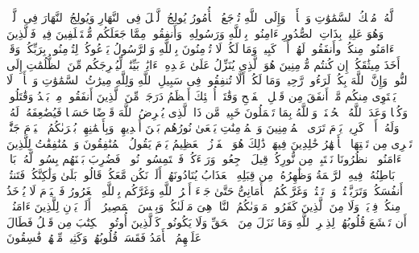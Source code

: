 \stopbuffer%
\startbuffer[\q:57:5]
لَّهُۥ مُلۡكُ ٱلسَّمَٰوَٰتِ وَٱلۡأَرۡضِۚ وَإِلَى ٱللَّهِ تُرۡجَعُ ٱلۡأُمُورُ%
\stopbuffer%
\startbuffer[\q:57:6]
یُولِجُ ٱلَّیۡلَ فِی ٱلنَّهَارِ وَیُولِجُ ٱلنَّهَارَ فِی ٱلَّیۡلِۚ وَهُوَ عَلِیمُۢ بِذَاتِ ٱلصُّدُورِ%
\stopbuffer%
\startbuffer[\q:57:7]
ءَامِنُوا۟ بِٱللَّهِ وَرَسُولِهِۦ وَأَنفِقُوا۟ مِمَّا جَعَلَكُم مُّسۡتَخۡلَفِینَ فِیهِۖ فَٱلَّذِینَ ءَامَنُوا۟ مِنكُمۡ وأَنفَقُوا۟ لَهُمۡ أَجۡرࣱ كَبِیرࣱ%
\stopbuffer%
\startbuffer[\q:57:8]
وَمَا لَكُمۡ لَا تُؤۡمِنُونَ بِٱللَّهِ وَٱلرَّسُولُ یَدۡعُوكُمۡ لِتُؤۡمِنُوا۟ بِرَبِّكُمۡ وَقَدۡ أَخَذَ مِیثَٰقَكُمۡ إِن كُنتُم مُّؤۡمِنِینَ%
\stopbuffer%
\startbuffer[\q:57:9]
هُوَ ٱلَّذِی یُنَزِّلُ عَلَىٰ عَبۡدِهِۦۤ ءَایَٰتِۭ بَیِّنَٰتࣲ لِّیُخۡرِجَكُم مِّنَ ٱلظُّلُمَٰتِ إِلَى ٱلنُّورِۚ وَإِنَّ ٱللَّهَ بِكُمۡ لَرَءُوفࣱ رَّحِیمࣱ%
\stopbuffer%
\startbuffer[\q:57:10]
وَمَا لَكُمۡ أَلَّا تُنفِقُوا۟ فِی سَبِیلِ ٱللَّهِ وَلِلَّهِ مِیرَٰثُ ٱلسَّمَٰوَٰتِ وَٱلۡأَرۡضِۚ لَا یَسۡتَوِی مِنكُم مَّنۡ أَنفَقَ مِن قَبۡلِ ٱلۡفَتۡحِ وَقَٰتَلَۚ أُو۟لَٰۤئِكَ أَعۡظَمُ دَرَجَةࣰ مِّنَ ٱلَّذِینَ أَنفَقُوا۟ مِنۢ بَعۡدُ وَقَٰتَلُوا۟ۚ وَكُلࣰّا وَعَدَ ٱللَّهُ ٱلۡحُسۡنَىٰۚ وَٱللَّهُ بِمَا تَعۡمَلُونَ خَبِیرࣱ%
\stopbuffer%
\startbuffer[\q:57:11]
مَّن ذَا ٱلَّذِی یُقۡرِضُ ٱللَّهَ قَرۡضًا حَسَنࣰا فَیُضَٰعِفَهُۥ لَهُۥ وَلَهُۥۤ أَجۡرࣱ كَرِیمࣱ%
\stopbuffer%
\startbuffer[\q:57:12]
یَوۡمَ تَرَى ٱلۡمُؤۡمِنِینَ وَٱلۡمُؤۡمِنَٰتِ یَسۡعَىٰ نُورُهُم بَیۡنَ أَیۡدِیهِمۡ وَبِأَیۡمَٰنِهِمۖ بُشۡرَىٰكُمُ ٱلۡیَوۡمَ جَنَّٰتࣱ تَجۡرِی مِن تَحۡتِهَا ٱلۡأَنۡهَٰرُ خَٰلِدِینَ فِیهَاۚ ذَٰلِكَ هُوَ ٱلۡفَوۡزُ ٱلۡعَظِیمُ%
\stopbuffer%
\startbuffer[\q:57:13]
یَوۡمَ یَقُولُ ٱلۡمُنَٰفِقُونَ وَٱلۡمُنَٰفِقَٰتُ لِلَّذِینَ ءَامَنُوا۟ ٱنظُرُونَا نَقۡتَبِسۡ مِن نُّورِكُمۡ قِیلَ ٱرۡجِعُوا۟ وَرَاۤءَكُمۡ فَٱلۡتَمِسُوا۟ نُورࣰاۖ فَضُرِبَ بَیۡنَهُم بِسُورࣲ لَّهُۥ بَابُۢ بَاطِنُهُۥ فِیهِ ٱلرَّحۡمَةُ وَظَٰهِرُهُۥ مِن قِبَلِهِ ٱلۡعَذَابُ%
\stopbuffer%
\startbuffer[\q:57:14]
یُنَادُونَهُمۡ أَلَمۡ نَكُن مَّعَكُمۡۖ قَالُوا۟ بَلَىٰ وَلَٰكِنَّكُمۡ فَتَنتُمۡ أَنفُسَكُمۡ وَتَرَبَّصۡتُمۡ وَٱرۡتَبۡتُمۡ وَغَرَّتۡكُمُ ٱلۡأَمَانِیُّ حَتَّىٰ جَاۤءَ أَمۡرُ ٱللَّهِ وَغَرَّكُم بِٱللَّهِ ٱلۡغَرُورُ%
\stopbuffer%
\startbuffer[\q:57:15]
فَٱلۡیَوۡمَ لَا یُؤۡخَذُ مِنكُمۡ فِدۡیَةࣱ وَلَا مِنَ ٱلَّذِینَ كَفَرُوا۟ۚ مَأۡوَىٰكُمُ ٱلنَّارُۖ هِیَ مَوۡلَىٰكُمۡۖ وَبِئۡسَ ٱلۡمَصِیرُ%
\stopbuffer%
\startbuffer[\q:57:16]
۞ أَلَمۡ یَأۡنِ لِلَّذِینَ ءَامَنُوۤا۟ أَن تَخۡشَعَ قُلُوبُهُمۡ لِذِكۡرِ ٱللَّهِ وَمَا نَزَلَ مِنَ ٱلۡحَقِّ وَلَا یَكُونُوا۟ كَٱلَّذِینَ أُوتُوا۟ ٱلۡكِتَٰبَ مِن قَبۡلُ فَطَالَ عَلَیۡهِمُ ٱلۡأَمَدُ فَقَسَتۡ قُلُوبُهُمۡۖ وَكَثِیرࣱ مِّنۡهُمۡ فَٰسِقُونَ%
\stopbuffer%
\startbuffer[\q:57:17]
